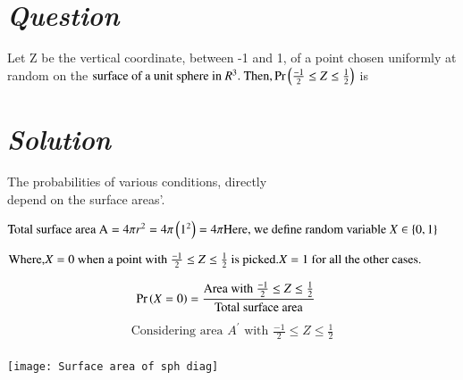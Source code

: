 \documentclass[journal,12pt,twocolumn]{IEEEtran}
\begin{document}
\section*{\emph{Question}}
Let Z be the vertical coordinate, between -1 and 1, of a point chosen uniformly at random on the
\begin{math}
\text{surface of a unit sphere in }R^3.\text{ Then,} \Pr\left(\frac{-1}{2} \leq Z \leq \frac{1}{2}\right)
\end{math}
is

\section*{\emph{Solution}}
The probabilities of various conditions, directly 
\\depend on the surface areas'.

\begin{math}
\text{Total surface area A} = 4\pi r^2 = 4\pi\left(1^2\right) = 4\pi
\\\text{Here, we define random variable }X \in  \left\{0, 1\right\}
\end{math}

\begin{math}
\text{Where,}
\\X = 0 \text{ when a point with } {\frac{-1}{2} \leq Z \leq \frac{1}{2}} \text{ is picked.}
\\X = 1 \text{ for all the other cases.}
\end{math}

\begin{align}
    \Pr\left(X=0\right) &= \frac{\text{Area with }\frac{-1}{2} \leq Z \leq \frac{1}{2}}{\text{Total surface area}}
\end{align}
\begin{align}
\text{Considering area }A^\prime \text{ with } \frac{-1}{2} \leq Z \leq \frac{1}{2}
\end{align}
\\\texttt{[image: Surface area of sph diag]}
\end{document}
